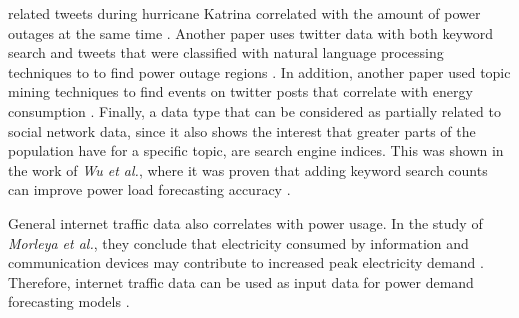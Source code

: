 related tweets during hurricane Katrina correlated with the amount of 
power outages at the same time \cite{poweroutagetwitter}.
Another paper uses twitter data with both keyword search and 
tweets that were classified with natural language processing techniques to
to find power outage regions \cite{twitterpoweroutagelighttime}.
In addition, another paper used topic mining techniques to find
events on twitter posts that correlate with energy consumption 
\cite{twittertopicevent}.
Finally, a data type that can be considered as partially related to social 
network data, since it also shows the interest that greater parts of 
the population have for a specific topic, are search engine indices.
This was shown in the work of \textit{Wu et al.}, where it was proven that adding 
keyword search counts can improve power load forecasting accuracy 
\cite{googlepowerforecast}.

General internet traffic data also correlates with power usage.
In the study of \textit{Morleya et al.}, they conclude that 
electricity consumed by information and communication devices
may contribute to increased peak electricity demand 
\cite{internettrafficenergycorrelation}.
Therefore, internet traffic data can be used as input data for 
power demand forecasting models \cite{electricityinternetforecast}. 

